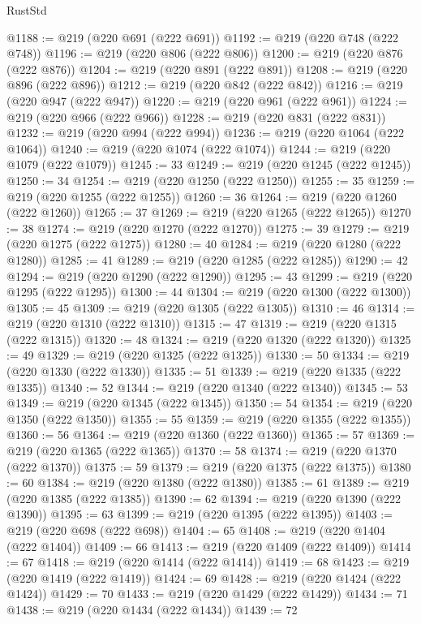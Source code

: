 \begin{lexlean}{RustStd}
\begin{coremodule}
@1188 := @219 (@220 @691 (@222 @691))
@1192 := @219 (@220 @748 (@222 @748))
@1196 := @219 (@220 @806 (@222 @806))
@1200 := @219 (@220 @876 (@222 @876))
@1204 := @219 (@220 @891 (@222 @891))
@1208 := @219 (@220 @896 (@222 @896))
@1212 := @219 (@220 @842 (@222 @842))
@1216 := @219 (@220 @947 (@222 @947))
@1220 := @219 (@220 @961 (@222 @961))
@1224 := @219 (@220 @966 (@222 @966))
@1228 := @219 (@220 @831 (@222 @831))
@1232 := @219 (@220 @994 (@222 @994))
@1236 := @219 (@220 @1064 (@222 @1064))
@1240 := @219 (@220 @1074 (@222 @1074))
@1244 := @219 (@220 @1079 (@222 @1079))
@1245 := 33
@1249 := @219 (@220 @1245 (@222 @1245))
@1250 := 34
@1254 := @219 (@220 @1250 (@222 @1250))
@1255 := 35
@1259 := @219 (@220 @1255 (@222 @1255))
@1260 := 36
@1264 := @219 (@220 @1260 (@222 @1260))
@1265 := 37
@1269 := @219 (@220 @1265 (@222 @1265))
@1270 := 38
@1274 := @219 (@220 @1270 (@222 @1270))
@1275 := 39
@1279 := @219 (@220 @1275 (@222 @1275))
@1280 := 40
@1284 := @219 (@220 @1280 (@222 @1280))
@1285 := 41
@1289 := @219 (@220 @1285 (@222 @1285))
@1290 := 42
@1294 := @219 (@220 @1290 (@222 @1290))
@1295 := 43
@1299 := @219 (@220 @1295 (@222 @1295))
@1300 := 44
@1304 := @219 (@220 @1300 (@222 @1300))
@1305 := 45
@1309 := @219 (@220 @1305 (@222 @1305))
@1310 := 46
@1314 := @219 (@220 @1310 (@222 @1310))
@1315 := 47
@1319 := @219 (@220 @1315 (@222 @1315))
@1320 := 48
@1324 := @219 (@220 @1320 (@222 @1320))
@1325 := 49
@1329 := @219 (@220 @1325 (@222 @1325))
@1330 := 50
@1334 := @219 (@220 @1330 (@222 @1330))
@1335 := 51
@1339 := @219 (@220 @1335 (@222 @1335))
@1340 := 52
@1344 := @219 (@220 @1340 (@222 @1340))
@1345 := 53
@1349 := @219 (@220 @1345 (@222 @1345))
@1350 := 54
@1354 := @219 (@220 @1350 (@222 @1350))
@1355 := 55
@1359 := @219 (@220 @1355 (@222 @1355))
@1360 := 56
@1364 := @219 (@220 @1360 (@222 @1360))
@1365 := 57
@1369 := @219 (@220 @1365 (@222 @1365))
@1370 := 58
@1374 := @219 (@220 @1370 (@222 @1370))
@1375 := 59
@1379 := @219 (@220 @1375 (@222 @1375))
@1380 := 60
@1384 := @219 (@220 @1380 (@222 @1380))
@1385 := 61
@1389 := @219 (@220 @1385 (@222 @1385))
@1390 := 62
@1394 := @219 (@220 @1390 (@222 @1390))
@1395 := 63
@1399 := @219 (@220 @1395 (@222 @1395))
@1403 := @219 (@220 @698 (@222 @698))
@1404 := 65
@1408 := @219 (@220 @1404 (@222 @1404))
@1409 := 66
@1413 := @219 (@220 @1409 (@222 @1409))
@1414 := 67
@1418 := @219 (@220 @1414 (@222 @1414))
@1419 := 68
@1423 := @219 (@220 @1419 (@222 @1419))
@1424 := 69
@1428 := @219 (@220 @1424 (@222 @1424))
@1429 := 70
@1433 := @219 (@220 @1429 (@222 @1429))
@1434 := 71
@1438 := @219 (@220 @1434 (@222 @1434))
@1439 := 72

\end{coremodule}
\end{lexlean}
